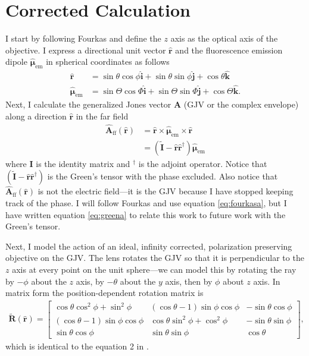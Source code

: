 \documentclass[11pt]{article}
\providecommand{\mb}[1]{\mathbf{#1}}
\providecommand{\mh}[1]{\mathbf{\hat{#1}}}
\providecommand{\bs}[1]{\boldsymbol{#1}}
\begin{document}
\section{Corrected Calculation}
I start by following Fourkas and define the $z$ axis as the optical axis of the
objective. I express a directional unit vector $\hat{\mb{r}}$ and the
fluorescence emission dipole $\hat{\bs{\mu}}_{\text{em}}$ in spherical
coordinates as follows
\begin{align}
  \hat{\mb{r}} &= \sin\theta\cos\phi\hat{\mb{i}} + \sin\theta\sin\phi\hat{\mb{j}} + \cos\theta\hat{\mb{k}}\label{eq:r_coords}\\
  \hat{\bs{\mu}}_{\text{em}} &= \sin\Theta\cos\Phi\hat{\mb{i}} + \sin\Theta\sin\Phi\hat{\mb{j}} + \cos\Theta\hat{\mb{k}}.\label{eq:mu_coords}
\end{align}
Next, I calculate the generalized Jones vector $\mb{A}$ (GJV or the complex
envelope) along a direction $\hat{\mb{r}}$ in the far field
\begin{align}
\mb{\hat{A}}_{\text{ff}}(\hat{\mb{r}}) &= \mh{r}\times\hat{\bs{\mu}}_{\text{em}}\times\mh{r} \label{eq:fourkasa}\\ &= (\tilde{\mb{I}} - \hat{\mb{r}}\hat{\mb{r}}^{\dagger})\hat{\bs{\mu}}_{\text{em}} \label{eq:greena} 
\end{align}
where $\mb{I}$ is the identity matrix and ${}^{\dagger}$ is the adjoint
operator. Notice that $(\tilde{\mb{I}} - \hat{\mb{r}}\hat{\mb{r}}^{\dagger})$ is
the Green's tensor with the phase excluded. Also notice that $\mb{\hat{A}}_{\text{ff}}(\mh{r})$ is
not the electric field---it is the GJV because I have stopped keeping track of
the phase. I will follow Fourkas and use equation \ref{eq:fourkasa}, but I have
written equation \ref{eq:greena} to relate this work to future work with the
Green's tensor.

Next, I model the action of an ideal, infinity corrected, polarization
preserving objective on the GJV. The lens rotates the GJV so that it is
perpendicular to the $z$ axis at every point on the unit sphere---we can model this by rotating the ray by $-\phi$ about the $z$ axis, by $-\theta$ about the $y$ axis, then by $\phi$ about $z$ axis. In matrix form the position-dependent rotation matrix is
\begin{align}  
  \tilde{\mb{R}}(\mh{r}) = \begin{bmatrix} \cos\theta\cos^2\phi + \sin^2\phi & (\cos\theta -1)\sin\phi\cos\phi & -\sin\theta\cos\phi\\ (\cos\theta - 1)\sin\phi\cos\phi & \cos\theta\sin^2\phi + \cos^2\phi & -\sin\theta\sin\phi \\ \sin\theta\cos\phi& \sin\theta\sin\phi & \cos\theta \end{bmatrix},\label{eq:matrix}
\end{align}
which is identical to the equation 2 in \cite{fourkas}.
\end{document}
